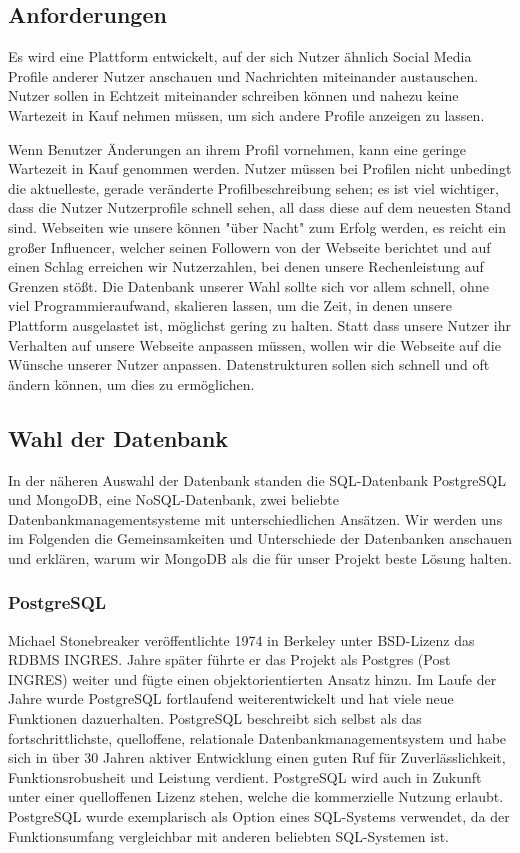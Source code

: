\subsection{Anforderungen}
Es wird eine Plattform entwickelt, auf der sich Nutzer ähnlich Social Media Profile anderer Nutzer anschauen und Nachrichten miteinander austauschen. Nutzer sollen in Echtzeit miteinander schreiben können und nahezu keine Wartezeit in Kauf nehmen müssen, um sich andere Profile anzeigen zu lassen. 
 
Wenn Benutzer Änderungen an ihrem Profil vornehmen, kann eine geringe Wartezeit in Kauf genommen werden. Nutzer müssen bei Profilen nicht unbedingt die aktuelleste, gerade veränderte Profilbeschreibung sehen; es ist viel wichtiger, dass die Nutzer Nutzerprofile schnell sehen, all dass diese auf dem neuesten Stand sind. 
Webseiten wie unsere können "über Nacht" zum Erfolg werden, es reicht ein großer Influencer, welcher seinen Followern von der Webseite berichtet und auf einen Schlag erreichen wir Nutzerzahlen, bei denen unsere Rechenleistung auf Grenzen stößt. Die Datenbank unserer Wahl sollte sich vor allem schnell, ohne viel Programmieraufwand, skalieren lassen, um die Zeit, in denen unsere Plattform ausgelastet ist, möglichst gering zu halten. 
Statt dass unsere Nutzer ihr Verhalten auf unsere Webseite anpassen müssen, wollen wir die Webseite auf die Wünsche unserer Nutzer anpassen. Datenstrukturen sollen sich schnell und oft ändern können, um dies zu ermöglichen.

\subsection{Wahl der Datenbank}
In der näheren Auswahl der Datenbank standen die SQL-Datenbank PostgreSQL und MongoDB, eine NoSQL-Datenbank, zwei beliebte Datenbankmanagementsysteme mit unterschiedlichen Ansätzen. Wir werden uns im Folgenden die Gemeinsamkeiten und Unterschiede der Datenbanken anschauen und erklären, warum wir MongoDB als die für unser Projekt beste Lösung halten.

\subsubsection{PostgreSQL}
Michael Stonebreaker veröffentlichte 1974 in Berkeley unter BSD-Lizenz das RDBMS INGRES. Jahre später führte er das Projekt als Postgres (Post INGRES) weiter und fügte einen objektorientierten Ansatz hinzu. \cite{PG1} Im Laufe der Jahre wurde PostgreSQL fortlaufend weiterentwickelt und hat viele neue Funktionen dazuerhalten.
PostgreSQL beschreibt sich selbst als das fortschrittlichste, quelloffene, relationale Datenbankmanagementsystem und habe sich in über 30 Jahren aktiver Entwicklung einen guten Ruf für Zuverlässlichkeit, Funktionsrobusheit und Leistung verdient. \cite{PG2} PostgreSQL wird auch in Zukunft unter einer quelloffenen Lizenz stehen, welche die kommerzielle Nutzung erlaubt. \cite{PG3}
PostgreSQL wurde exemplarisch als Option eines SQL-Systems verwendet, da der Funktionsumfang vergleichbar mit anderen beliebten SQL-Systemen ist. \cite{PG4}


